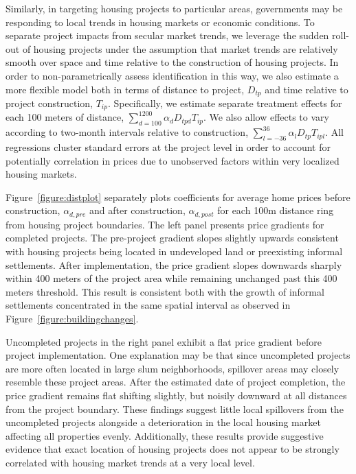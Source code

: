 \documentclass[12pt]{article}
\begin{document}
Similarly, in targeting housing projects to particular areas, governments may be responding to local trends in housing markets or economic conditions.  To separate project impacts from secular market trends, we leverage the sudden roll-out of housing projects under the assumption that market trends are relatively smooth over space and time relative to the construction of housing projects.  In order to non-parametrically assess identification in this way, we also estimate a more flexible model both in terms of distance to project, $D_{tp}$ and time relative to project construction, $T_{ip}$.  Specifically, we estimate separate treatment effects for each 100 meters of distance, $\sum_{d=100}^{1200} \alpha_d D_{tpd} T_{ip}$.  We also allow effects to vary according to two-month intervals relative to construction, $\sum_{l=-36}^{36} \alpha_l D_{tp}T_{ipl}$.  All regressions cluster standard errors at the project level in order to account for potentially correlation in prices due to unobserved factors within very localized housing markets.

Figure~\ref{figure:distplot} separately plots coefficients for average home prices before construction, $\alpha_{d,pre}$ and after construction, $\alpha_{d,post}$ for each 100m distance ring from housing project boundaries.  The left panel presents price gradients for completed projects.  The pre-project gradient slopes slightly upwards consistent with housing projects being located in undeveloped land or preexisting informal settlements.  After implementation, the price gradient slopes downwards sharply within 400 meters of the project area while remaining unchanged past this 400 meters threshold.  This result is consistent both with the growth of informal settlements concentrated in the same spatial interval as observed in Figure~\ref{figure:buildingchanges}.

Uncompleted projects in the right panel exhibit a flat price gradient before project implementation.  One explanation may be that since uncompleted projects are more often located in large slum neighborhoods, spillover areas may closely resemble these project areas.  After the estimated date of project completion, the price gradient remains flat shifting slightly, but noisily downward at all distances from the project boundary.  These findings suggest little local spillovers from the uncompleted projects alongside a deterioration in the local housing market affecting all properties evenly.  Additionally, these results provide suggestive evidence that exact location of housing projects does not appear to be strongly correlated with housing market trends at a very local level.
\end{document}
